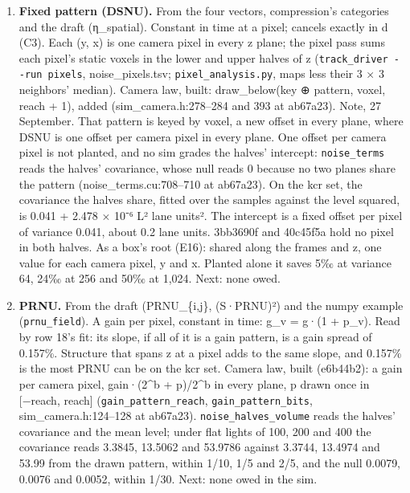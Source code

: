 \begin{enumerate}
\item \textbf{Fixed pattern (DSNU).} From the four vectors, compression's categories and the draft (η\_\allowbreak{}spatial). Constant in time at a pixel; cancels exactly in d (C3). Each (y, x) is one camera pixel in every z plane; the pixel pass sums each pixel's static voxels in the lower and upper halves of z (\texttt{track\_\allowbreak{}driver -\allowbreak{}-\allowbreak{}run pixels}, noise\_\allowbreak{}pixels.tsv; \texttt{pixel\_\allowbreak{}analysis.\allowbreak{}py}, maps less their 3 × 3 neighbors' median). Camera law, built: draw\_\allowbreak{}below(key ⊕ pattern, voxel, reach + 1), added (sim\_\allowbreak{}camera.h:278–284 and 393 at ab67a23). Note, 27 September. That pattern is keyed by voxel, a new offset in every plane, where DSNU is one offset per camera pixel in every plane. One offset per camera pixel is not planted, and no sim grades the halves' intercept: \texttt{noise\_\allowbreak{}terms} reads the halves' covariance, whose null reads 0 because no two planes share the pattern (noise\_\allowbreak{}terms.cu:708–710 at ab67a23). On the kcr set, the covariance the halves share, fitted over the samples against the level squared, is 0.041 + 2.478 × 10⁻⁶ L² lane units². The intercept is a fixed offset per pixel of variance 0.041, about 0.2 lane units. 3bb3690f and 40c45f5a hold no pixel in both halves. As a box's root (E16): shared along the frames and z, one value for each camera pixel, y and x. Planted alone it saves 5‰ at variance 64, 24‰ at 256 and 50‰ at 1,024. Next: none owed.
\item \textbf{PRNU.} From the draft (PRNU\_\allowbreak{}\{i,j\}, (S·PRNU)²) and the numpy example (\texttt{prnu\_\allowbreak{}field}). A gain per pixel, constant in time: g\_\allowbreak{}v = g·(1 + p\_\allowbreak{}v). Read by row 18's fit: its slope, if all of it is a gain pattern, is a gain spread of 0.157\%. Structure that spans z at a pixel adds to the same slope, and 0.157\% is the most PRNU can be on the kcr set. Camera law, built (e6b44b2): a gain per camera pixel, gain·(2\textasciicircum{}b + p)/2\textasciicircum{}b in every plane, p drawn once in [−reach, reach] (\texttt{gain\_\allowbreak{}pattern\_\allowbreak{}reach}, \texttt{gain\_\allowbreak{}pattern\_\allowbreak{}bits}, sim\_\allowbreak{}camera.h:124–128 at ab67a23). \texttt{noise\_\allowbreak{}halves\_\allowbreak{}volume} reads the halves' covariance and the mean level; under flat lights of 100, 200 and 400 the covariance reads 3.3845, 13.5062 and 53.9786 against 3.3744, 13.4974 and 53.99 from the drawn pattern, within 1/10, 1/5 and 2/5, and the null 0.0079, 0.0076 and 0.0052, within 1/30. Next: none owed in the sim.


\end{enumerate}
